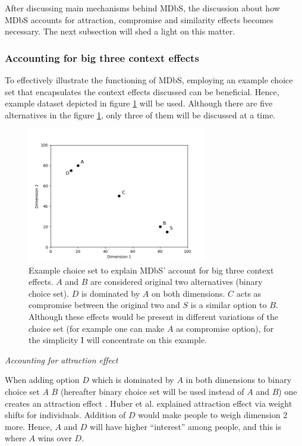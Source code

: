 \documentclass[a4paper,12pt]{article}
\newcommand{\citeyearonly}[1]{\citeyearpar{#1}}
\begin{document}
After discussing main mechanisms behind MDbS, the discussion about how MDbS accounts for attraction, compromise and similarity effects becomes necessary. The next subsection will shed a light on this matter.

\subsubsection{Accounting for big three context effects}

To effectively illustrate the functioning of MDbS, employing an example choice set that encapsulates the context effects discussed can be beneficial. Hence, example dataset depicted in figure \ref{fig:MDBsContextExample} will be used. Although there are five alternatives in the figure \ref{fig:MDBsContextExample}, only three of them will be discussed at a time.

\begin{figure}[h]
    \centering
    \includegraphics[width=0.7\textwidth]{staticFiles/contextEffectExampleScatterplot.png}
    \caption[MDbS’ account for big three context effects]{Example choice set to explain MDbS' account for big three context effects. $A$ and $B$ are considered original two alternatives (binary choice set). $D$ is dominated by $A$ on both dimensions. $C$ acts as compromise between the original two and $S$ is a similar option to $B$. Although these effects would be present in different variations of the choice set (for example one can make $A$ as compromise option), for the simplicity I will concentrate on this example.} %
    \label{fig:MDBsContextExample} %

\end{figure}

\textit{Accounting for attraction effect}

When adding option $D$ which is dominated by $A$ in both dimensions to binary choice set $A$ $B$ (hereafter binary choice set will be used instead of $A$ and $B$) one creates an attraction effect \citep{huberEtAl82, huberPuto83}. Huber et al. \citeyearonly{huberEtAl82} explained attraction effect via weight shifts for individuals. Addition of $D$ would make people to weigh dimension 2 more. Hence, $A$ and $D$ will have higher ``interest'' among people, and this is where $A$ wins over $D$.
\end{document}
